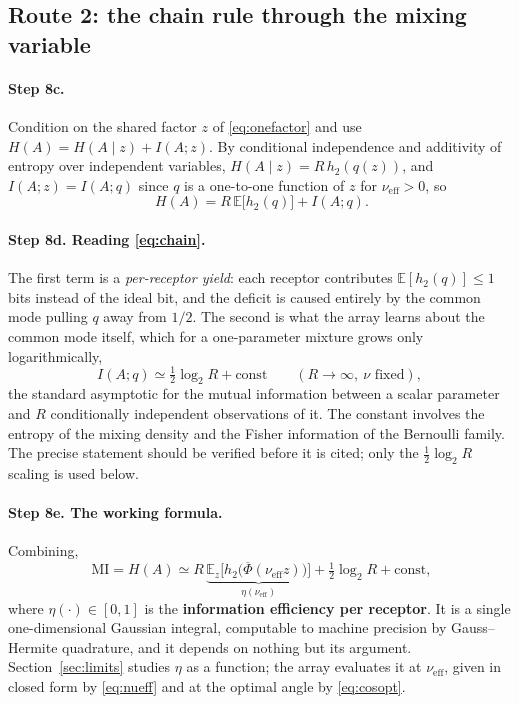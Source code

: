 \documentclass[11pt,a4paper]{article}
\newcommand{\EE}{\mathbb{E}}
\newcommand{\Phibar}{\overline{\Phi}}
\newcommand{\htwo}{h_2}
\newcommand{\nueff}{\nu_{\mathrm{eff}}}
\begin{document}
\subsection{Route 2: the chain rule through the mixing variable}

\paragraph{Step 8c.} Condition on the shared factor $z$ of \eqref{eq:onefactor} and use
$H(A)=H(A\mid z)+I(A;z)$. By conditional independence and additivity of entropy over
independent variables, $H(A\mid z)=R\,\htwo(q(z))$, and $I(A;z)=I(A;q)$ since $q$ is a
one-to-one function of $z$ for $\nueff>0$, so
\begin{equation}
  \boxed{\;H(A)=R\,\EE\big[\htwo(q)\big]+I(A;q).}
  \label{eq:chain}
\end{equation}

\paragraph{Step 8d. Reading \eqref{eq:chain}.} The first term is a \emph{per-receptor
yield}: each receptor contributes $\EE[\htwo(q)]\le1$ bits instead of the ideal bit, and
the deficit is caused entirely by the common mode pulling $q$ away from $1/2$. The
second is what the array learns about the common mode itself, which for a one-parameter
mixture grows only logarithmically,
\begin{equation}
  I(A;q)\simeq\tfrac12\log_2 R+\text{const}
  \qquad (R\to\infty,\ \nu \text{ fixed}),
  \label{eq:clarke}
\end{equation}
the standard asymptotic for the mutual information between a scalar parameter and $R$
conditionally independent observations of it. The constant involves the entropy of the
mixing density and the Fisher information of the Bernoulli family. The precise statement
should be verified before it is cited; only the $\frac12\log_2 R$ scaling is used below.

\paragraph{Step 8e. The working formula.} Combining,
\begin{equation}
  \boxed{\;\mathrm{MI}=H(A)\simeq R\,
   \underbrace{\EE_z\big[\htwo\big(\Phibar(\nueff z)\big)\big]}_{\textstyle \eta(\nueff)}
   +\tfrac12\log_2 R+\text{const},}
  \label{eq:working}
\end{equation}
where $\eta(\cdot)\in[0,1]$ is the \textbf{information efficiency per receptor}. It is a
single one-dimensional Gaussian integral, computable to machine precision by
Gauss--Hermite quadrature, and it depends on nothing but its argument.
Section~\ref{sec:limits} studies $\eta$ as a function; the array evaluates it at $\nueff$,
given in closed form by \eqref{eq:nueff} and at the optimal angle by \eqref{eq:cosopt}.
\end{document}

